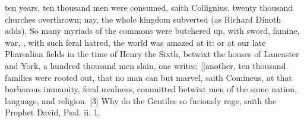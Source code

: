 {ten years, ten thousand men were consumed, saith Collignius, twenty
thousand churches overthrown; nay, the whole kingdom subverted (as
Richard Dinoth adds). So many myriads of the commons were
butchered up, with sword, famine, war, , with such feral hatred, the
world was amazed at it: or at our late Pharsalian fields in the time of
Henry the Sixth, betwixt the houses of Lancaster and York, a hundred
thousand men slain, one writes; [\baselineskip]another, ten thousand
families were rooted out, that no man can but marvel, saith Comineus,
at that barbarous immanity, feral madness, committed betwixt men of the
same nation, language, and religion. [3\baselineskip] Why do
the Gentiles so furiously rage, saith the Prophet David, Psal. ii. 1.

}
